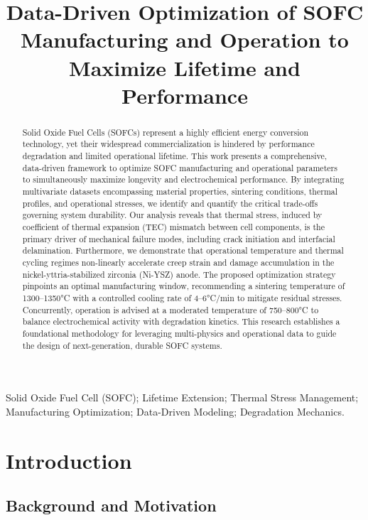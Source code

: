 \documentclass[10pt,conference]{IEEEtran}
\title{Data-Driven Optimization of SOFC Manufacturing and Operation to Maximize Lifetime and Performance}
\author{
\IEEEauthorblockN{Author Name}
\IEEEauthorblockA{Department of Mechanical Engineering\\
University of Technology\\
City, Country\\
email@domain.com}
}
\begin{document}
\maketitle

\begin{abstract}
Solid Oxide Fuel Cells (SOFCs) represent a highly efficient energy conversion technology, yet their widespread commercialization is hindered by performance degradation and limited operational lifetime. This work presents a comprehensive, data-driven framework to optimize SOFC manufacturing and operational parameters to simultaneously maximize longevity and electrochemical performance. By integrating multivariate datasets encompassing material properties, sintering conditions, thermal profiles, and operational stresses, we identify and quantify the critical trade-offs governing system durability. Our analysis reveals that thermal stress, induced by coefficient of thermal expansion (TEC) mismatch between cell components, is the primary driver of mechanical failure modes, including crack initiation and interfacial delamination. Furthermore, we demonstrate that operational temperature and thermal cycling regimes non-linearly accelerate creep strain and damage accumulation in the nickel-yttria-stabilized zirconia (Ni-YSZ) anode. The proposed optimization strategy pinpoints an optimal manufacturing window, recommending a sintering temperature of 1300–1350°C with a controlled cooling rate of 4–6°C/min to mitigate residual stresses. Concurrently, operation is advised at a moderated temperature of 750–800°C to balance electrochemical activity with degradation kinetics. This research establishes a foundational methodology for leveraging multi-physics and operational data to guide the design of next-generation, durable SOFC systems.
\end{abstract}

\begin{IEEEkeywords}
Solid Oxide Fuel Cell (SOFC); Lifetime Extension; Thermal Stress Management; Manufacturing Optimization; Data-Driven Modeling; Degradation Mechanics.
\end{IEEEkeywords}

\section{Introduction}

\subsection{Background and Motivation}
\end{document}
